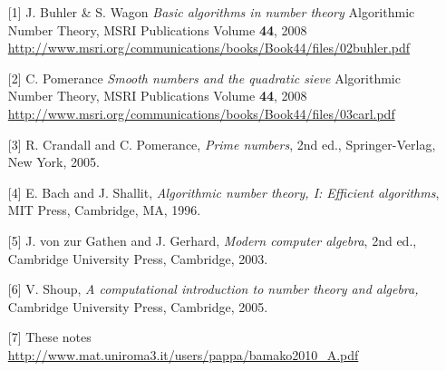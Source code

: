 \documentclass[landscape]{powersem} %
\newcommand{\heading}[1]{%
 \begin{center}
  \large\bf
  \Ovalbox{{\textcolor{conceptcolor}{#1}}}%
 \end{center}
 \vspace{1ex minus 1ex}}
\begin{document}
\begin{slide}
\heading{\textcolor{red}{R\'ef\'erences pour ce cours}}
\vspace*{-2mm}\small{\begin{itemize}
 \item[\mbox{[1]}] J. Buhler \& S. Wagon \textit{Basic algorithms in number theory} Algorithmic Number Theory,
MSRI Publications
Volume \textbf{44}, 2008
{\small \url{http://www.msri.org/communications/books/Book44/files/02buhler.pdf}
\href{http://www.msri.org/communications/books/Book44/files/02buhler.pdf}{}}
\item[\mbox{[2]}] C. Pomerance \textit{Smooth numbers and the quadratic sieve}
Algorithmic Number Theory,
MSRI Publications
Volume \textbf{44}, 2008
{\small \url{http://www.msri.org/communications/books/Book44/files/03carl.pdf}
\href{http://www.msri.org/communications/books/Book44/files/03carl.pdf}{}}
\item[\mbox{[3]}] R. Crandall and C. Pomerance, \textit{Prime numbers}, 2nd
ed., Springer-Verlag, New York, 2005.
\item[\mbox{[4]}] E. Bach and J. Shallit, \textit{Algorithmic number theory, I: Efficient
algorithms}, MIT Press, Cambridge, MA, 1996.
\item[\mbox{[5]}] J. von zur Gathen and J. Gerhard, \textit{Modern computer
algebra}, 2nd ed., Cambridge University Press, Cambridge, 2003.
\item[\mbox{[6]}] V. Shoup, \textit{A computational introduction to number theory and algebra,}
Cambridge University Press, Cambridge, 2005.
\item[\mbox{[7]}] 
These notes \vspace*{-2mm} 
{\small \url{http://www.mat.uniroma3.it/users/pappa/bamako2010_A.pdf}
\href{http://www.mat.uniroma3.it/users/pappa/bamako2010_A.pdf}{}}
\end{itemize}}
\end{slide}
\end{document}
